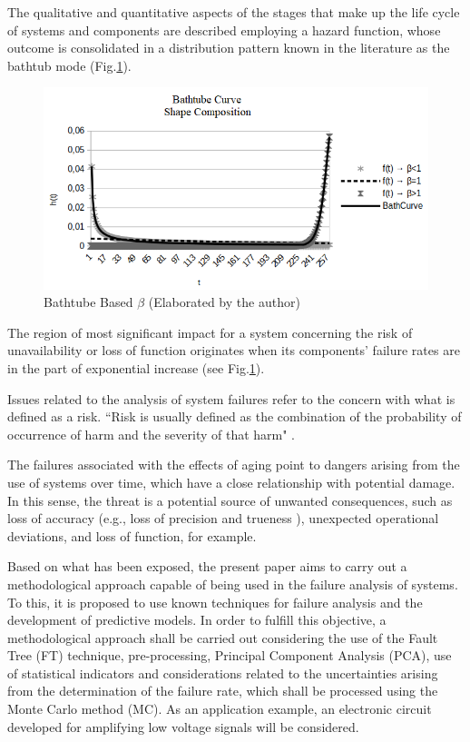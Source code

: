 \documentclass{ws-m3as}
\begin{document}
The qualitative and quantitative aspects of the stages that make up the life cycle of systems and components are described employing a hazard function, whose outcome is consolidated in a distribution pattern known in the literature as the bathtub mode \cite{Klutke2003} (Fig.\ref{fig:1}).
\begin{figure} [H]
	\centering
	\includegraphics[width=0.7\linewidth]{Figures/BathCurve2}
	\caption{Bathtube Based $\beta$ (Elaborated by the author)}
	\label{fig:1}
\end{figure}

The region of most significant impact for a system concerning the risk of unavailability or loss of function originates when its components' failure rates are in the part of exponential increase (see Fig.\ref{fig:1}). 

Issues related to the analysis of system failures refer to the concern with what is defined as a risk. ``Risk is usually defined as the combination of the probability of occurrence of harm and the severity of that harm" \cite{Matsuoka2012}.

The failures associated with the effects of aging point to dangers arising from the use of systems over time, which have a close relationship with potential damage.  In this sense, the threat is a potential source of unwanted consequences, such as loss of accuracy (e.g., loss of precision and trueness \cite {VIM2012}), unexpected operational deviations, and loss of function, for example.

Based on what has been exposed, the present paper aims to carry out a methodological approach capable of being used in the failure analysis of systems. To this, it is proposed to use known techniques for failure analysis and the development of predictive models. In order to fulfill this objective, a methodological approach shall be carried out considering the use of the Fault Tree (FT) technique, pre-processing, Principal Component Analysis (PCA), use of statistical indicators and considerations related to the uncertainties arising from the determination of the failure rate, which shall be processed using the Monte Carlo method (MC). As an application example, an electronic circuit developed for amplifying low voltage signals will be considered.
\end{document}
